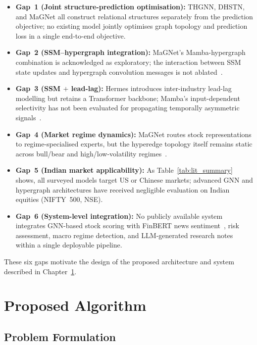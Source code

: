 \documentclass[a4paper,11pt]{report}
\begin{document}
\begin{itemize}
    \item \textbf{Gap~1 (Joint structure-prediction optimisation):} THGNN, DHSTN, and MaGNet all construct relational structures separately from the prediction objective; no existing model jointly optimises graph topology and prediction loss in a single end-to-end objective.
    \item \textbf{Gap~2 (SSM--hypergraph integration):} MaGNet's Mamba-hypergraph combination is acknowledged as exploratory; the interaction between SSM state updates and hypergraph convolution messages is not ablated~\cite{tan2025magnet}.
    \item \textbf{Gap~3 (SSM $+$ lead-lag):} Hermes introduces inter-industry lead-lag modelling but retains a Transformer backbone; Mamba's input-dependent selectivity has not been evaluated for propagating temporally asymmetric signals~\cite{qiu2025hermes}.
    \item \textbf{Gap~4 (Market regime dynamics):} MaGNet routes stock representations to regime-specialised experts, but the hyperedge topology itself remains static across bull/bear and high/low-volatility regimes~\cite{tan2025magnet}.
    \item \textbf{Gap~5 (Indian market applicability):} As Table~\ref{tab:lit_summary} shows, all surveyed models target US or Chinese markets; advanced GNN and hypergraph architectures have received negligible evaluation on Indian equities (NIFTY~500, NSE).
    \item \textbf{Gap~6 (System-level integration):} No publicly available system integrates GNN-based stock scoring with FinBERT news sentiment~\cite{araci2019finbert}, risk assessment, macro regime detection, and LLM-generated research notes within a single deployable pipeline.
\end{itemize}

These six gaps motivate the design of the proposed architecture and system described in Chapter~\ref{ch:ProposedAlgorithm}.\chapter{Proposed Algorithm}
\label{ch:ProposedAlgorithm}

\section{Problem Formulation}
\label{sec:problem}
\end{document}
